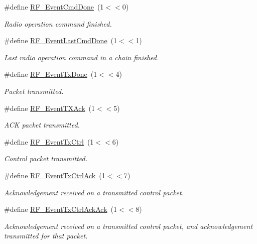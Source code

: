 \begin{DoxyCompactItemize}
\item 
\#define \hyperlink{group___r_f___core___events_gaa1534b443f03187f07f55b0198306a27}{R\+F\+\_\+\+Event\+Cmd\+Done}~(1$<$$<$0)
\begin{DoxyCompactList}\small\item\em Radio operation command finished. \end{DoxyCompactList}\item 
\#define \hyperlink{group___r_f___core___events_ga2d60db886271cf8e08c7b6b2f5e534f1}{R\+F\+\_\+\+Event\+Last\+Cmd\+Done}~(1$<$$<$1)
\begin{DoxyCompactList}\small\item\em Last radio operation command in a chain finished. \end{DoxyCompactList}\item 
\#define \hyperlink{group___r_f___core___events_ga4e8f8b70a9cd745561251d61940880f6}{R\+F\+\_\+\+Event\+Tx\+Done}~(1$<$$<$4)
\begin{DoxyCompactList}\small\item\em Packet transmitted. \end{DoxyCompactList}\item 
\#define \hyperlink{group___r_f___core___events_gab1ab01acc148654e8b3dfe42d64785b1}{R\+F\+\_\+\+Event\+T\+X\+Ack}~(1$<$$<$5)
\begin{DoxyCompactList}\small\item\em A\+C\+K packet transmitted. \end{DoxyCompactList}\item 
\#define \hyperlink{group___r_f___core___events_ga8421bd3a69743f088ac534f85b099a8d}{R\+F\+\_\+\+Event\+Tx\+Ctrl}~(1$<$$<$6)
\begin{DoxyCompactList}\small\item\em Control packet transmitted. \end{DoxyCompactList}\item 
\#define \hyperlink{group___r_f___core___events_gaf15e72a260f7c2d3d659ad76cb876f9a}{R\+F\+\_\+\+Event\+Tx\+Ctrl\+Ack}~(1$<$$<$7)
\begin{DoxyCompactList}\small\item\em Acknowledgement received on a transmitted control packet. \end{DoxyCompactList}\item 
\#define \hyperlink{group___r_f___core___events_ga00c6a2c502c6b73310d7168d65134728}{R\+F\+\_\+\+Event\+Tx\+Ctrl\+Ack\+Ack}~(1$<$$<$8)
\begin{DoxyCompactList}\small\item\em Acknowledgement received on a transmitted control packet, and acknowledgement transmitted for that packet. \end{DoxyCompactList}\item 
$$
\end{DoxyCompactItemize}

